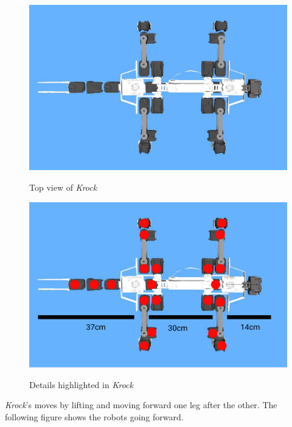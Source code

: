 \documentclass[../document.tex]{subfiles}
\begin{document}
\begin{figure}[H]
    \centering
    \includegraphics[width=\textwidth]{img/krock-top.jpg}
    \label{fig:krock-top}
    \caption{Top view of \emph{Krock}}
\end{figure}
\begin{figure}[H]
    \centering
      \includegraphics[width=\textwidth]{img/krock-top-highlight.png}
    \label{fig:krock-top-details}
    \caption{Details highlighted in \emph{Krock}}
\end{figure}
\emph{Krock}'s moves by lifting and moving forward one leg after the other. The following figure shows the robots going forward.
\end{document}
